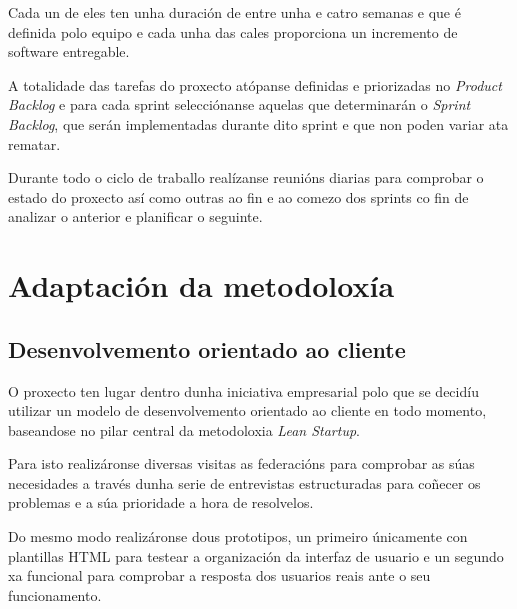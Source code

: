   Cada un de eles ten unha duración de entre unha e catro semanas e que é 
definida polo equipo e cada unha das cales proporciona un incremento de 
software entregable.

  A totalidade das tarefas do proxecto atópanse definidas e priorizadas no 
\emph{Product Backlog} e para cada sprint selecciónanse aquelas que determinarán 
o \emph{Sprint Backlog}, que serán implementadas durante dito sprint e que non 
poden variar ata rematar.


  Durante todo o ciclo de traballo realízanse reunións diarias para comprobar o 
estado do proxecto así como outras ao fin e ao comezo dos sprints co fin de 
analizar o anterior e planificar o seguinte.

  \section{Adaptación da metodoloxía}

    \subsection{Desenvolvemento orientado ao cliente}
      O proxecto ten lugar dentro dunha iniciativa empresarial polo que se 
decidíu utilizar un modelo de desenvolvemento orientado ao cliente en todo 
momento, baseandose no pilar central da metodoloxia \emph{Lean Startup}.

    Para isto realizáronse diversas visitas as federacións para comprobar as 
súas necesidades a través dunha serie de entrevistas estructuradas para 
coñecer os problemas e a súa prioridade a hora de resolvelos.

    Do mesmo modo realizáronse dous prototipos, un primeiro únicamente 
con plantillas HTML para testear a organización da interfaz de usuario e un 
segundo xa funcional para comprobar a resposta dos usuarios reais %
ante o seu funcionamento.

